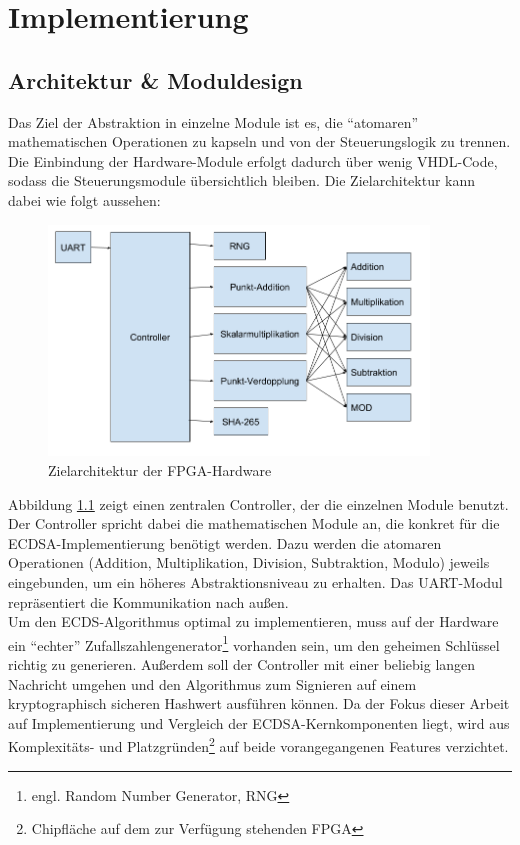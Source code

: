 
\chapter{Implementierung} \label{sec:impl}

\section{Architektur \& Moduldesign} \label{sec:march}

Das Ziel der Abstraktion in einzelne Module ist es, die ``atomaren'' mathematischen Operationen zu kapseln und von der Steuerungslogik zu trennen. Die Einbindung der Hardware-Module erfolgt dadurch über wenig VHDL-Code, sodass die Steuerungsmodule übersichtlich bleiben. Die Zielarchitektur kann dabei wie folgt aussehen: \\

\begin{figure}[H]
	\centering
  	\includegraphics[width=0.9\textwidth]{bilder/opmodules}
	\caption{Zielarchitektur der FPGA-Hardware}
	\label{fig:arch}
\end{figure}

Abbildung \ref{fig:arch} zeigt einen zentralen Controller, der die einzelnen Module benutzt. Der Controller spricht dabei die mathematischen Module an, die konkret für die ECDSA-Implementierung benötigt werden. Dazu werden die atomaren Operationen (Addition, Multiplikation, Division, Subtraktion, Modulo) jeweils eingebunden, um ein höheres Abstraktionsniveau zu erhalten. Das UART-Modul repräsentiert die Kommunikation nach außen. \\

Um den ECDS-Algorithmus optimal zu implementieren, muss auf der Hardware ein ``echter'' Zufallszahlengenerator\footnote{engl. Random Number Generator, RNG} vorhanden sein, um den geheimen Schlüssel richtig zu generieren. Außerdem soll der Controller mit einer beliebig langen Nachricht umgehen und den Algorithmus zum Signieren auf einem kryptographisch sicheren Hashwert ausführen können. Da der Fokus dieser Arbeit auf Implementierung und Vergleich der ECDSA-Kernkomponenten liegt, wird aus Komplexitäts- und Platzgründen\footnote{Chipfläche auf dem zur Verfügung stehenden FPGA} auf beide vorangegangenen Features verzichtet. \\

